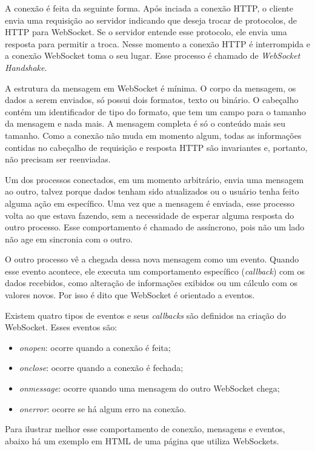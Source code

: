 \documentclass[a4paper,12pt]{article}
\begin{document}
A conexão é feita da seguinte forma. Após inciada a conexão HTTP, o cliente envia uma requisição ao servidor indicando que deseja trocar de protocolos, de HTTP para WebSocket. Se o servidor entende esse protocolo, ele envia uma resposta para permitir a troca. Nesse momento a conexão HTTP é interrompida e a conexão WebSocket toma o seu lugar. Esse processo é chamado de \emph{WebSocket Handshake}.

A estrutura da mensagem em WebSocket é mínima. O corpo da mensagem, os dados a serem enviados, só possui dois formatos, texto ou binário. O cabeçalho contém um identificador de tipo do formato, que tem um campo para o tamanho da mensagem e nada mais. A mensagem completa é só o conteúdo mais seu tamanho. Como a conexão não muda em momento algum, todas as informações contidas no cabeçalho de requisição e resposta HTTP são invariantes e, portanto, não precisam ser reenviadas.

Um dos processos conectados, em um momento arbitrário, envia uma mensagem ao outro, talvez porque dados tenham sido atualizados ou o usuário tenha feito alguma ação em específico. Uma vez que a mensagem é enviada, esse processo volta ao que estava fazendo, sem a necessidade de esperar alguma resposta do outro processo. Esse comportamento é chamado de assíncrono, pois não um lado não age em sincronia com o outro.

O outro processo vê a chegada dessa nova mensagem como um evento. Quando esse evento acontece, ele executa um comportamento específico (\emph{callback}) com os dados recebidos, como alteração de informações exibidos ou um cálculo com os valores novos. Por isso é dito que WebSocket é orientado a eventos.

Existem quatro tipos de eventos e seus \emph{callbacks} são definidos na criação do WebSocket. Esses eventos são:
\begin{itemize}

\item\emph{onopen}: ocorre quando a conexão é feita;

\item\emph{onclose}: ocorre quando a conexão é fechada;

\item\emph{onmessage}: ocorre quando uma mensagem do outro WebSocket chega;

\item\emph{onerror}: ocorre se há algum erro na conexão.
\end{itemize}


Para ilustrar melhor esse comportamento de conexão, mensagens e eventos, abaixo há um exemplo em HTML de uma página que utiliza WebSockets.
\end{document}
